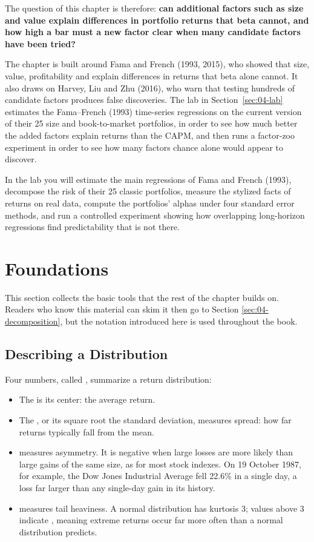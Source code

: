 The question of this chapter is therefore: \textbf{can additional factors such as size and value explain differences in portfolio returns that beta cannot, and how high a bar must a new factor clear when many candidate factors have been tried?}

The chapter is built around Fama and French (1993, 2015), who showed that size, value, profitability and  explain differences in returns that beta alone cannot. It also draws on Harvey, Liu and Zhu (2016), who warn that testing hundreds of candidate factors produces false discoveries. The lab in Section~\ref{sec:04-lab} estimates the Fama--French (1993) time-series regressions on the current version of their 25 size and book-to-market portfolios, in order to see how much better the added factors explain returns than the CAPM, and then runs a factor-zoo experiment in order to see how many factors chance alone would appear to discover.


In the lab you will estimate the main regressions of Fama and French (1993), decompose the risk of their 25 classic portfolios, measure the stylized facts of returns on real data, compute the portfolios' alphas under four standard error methods, and run a controlled experiment showing how overlapping long-horizon regressions find predictability that is not there.


\section{Foundations}
\label{sec:04-foundations}

This section collects the basic tools that the rest of the chapter builds on.
Readers who know this material can skim it then go to Section \ref{sec:04-decomposition}, but the notation introduced here is used throughout the book.

\subsection{Describing a Distribution}
Four numbers, called , summarize a return distribution:
\begin{itemize}
  \item The  is its center: the average return.
  \item The , or its square root the standard deviation, measures spread: how far returns typically fall from the mean.
  \item {} measures asymmetry. It is negative when large losses are more likely than large gains of the same size, as for most stock indexes. On 19 October 1987, for example, the Dow Jones Industrial Average fell 22.6\% in a single day, a loss far larger than any single-day gain in its history.
  \item {} measures tail heaviness. A normal distribution has kurtosis 3; values above 3 indicate , meaning extreme returns occur far more often than a normal distribution predicts.
\end{itemize}

